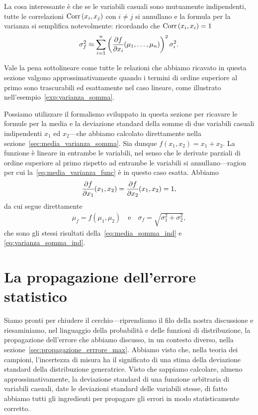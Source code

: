 La cosa interessante è che se le variabili casuali sono mutuamente
indipendenti, tutte le correlazioni $\text{Corr}\left(x_i, x_j\right)$ con $i \neq j$ si
annullano e la formula per la varianza si semplifica notevolmente: ricordando
che $\text{Corr}\left(x_i, x_i\right) = 1$
\begin{align}\label{eq:varianza_func_indipendente}
  \sigma^2_f \approx
  \sum_{i = 1}^{n} \left(\pd{f}{x_i}{\mu_1,\ldots,\mu_n}\right)^2 \sigma^2_i.
\end{align}

Vale la pena sottolineare come tutte le relazioni che abbiamo ricavato in
questa sezione valgono approssimativamente quando i termini di ordine
superiore al primo sono trascurabili ed esattamente nel caso lineare, come
illustrato nell'esempio~\ref{exp:varianza_somma}.

\begin{examplebox}
  \begin{example}\label{exp:varianza_somma}
    Possiamo utilizzare il formalismo sviluppato in questa sezione per ricavare
    le formule per la media e la deviazione standard della somme di due
    variabili casuali indipendenti $x_1$ ed $x_2$---che abbiamo calcolato
    direttamente nella sezione~\ref{sec:media_varianza_somma}.
    Sia dunque $f(x_1, x_2) = x_1 + x_2$. La funzione è lineare in entrambe
    le variabili, nel senso che le derivate parziali di ordine superiore al
    primo rispetto ad entrambe le variabili si annullano---ragion per cui
    la~\eqref{eq:media_varianza_func} è in questo caso esatta. Abbiamo
    \begin{align*}
      \pd{f}{x_1}{x_1, x_2} = \pd{f}{x_2}{x_1, x_2} = 1,
    \end{align*}
    da cui segue direttamente
    \begin{align*}
      \mu_f = f(\mu_1, \mu_2)
      \quad \text{e} \quad
      \sigma_f = \sqrt{\sigma_1^2 + \sigma_2^2},
    \end{align*}
    che sono gli stessi risultati della~\eqref{eq:media_somma_ind} e
    \eqref{eq:varianza_somma_ind}.
  \end{example}
\end{examplebox}


\section{La propagazione dell'errore statistico}
\label{sec:prop_errore_stat}

Siamo pronti per chiudere il cerchio---riprendiamo il filo della nostra
discussione e riesaminiamo, nel linguaggio della probabilità e delle funzioni
di distribuzione, la propagazione dell'errore che abbiamo discusso, in un
contesto diverso, nella sezione~\ref{sec:propagazione_errrore_max}.
Abbiamo visto che, nella teoria dei campioni, l'incertezza di misura ha il
significato di una stima della deviazione standard della distribuzione
generatrice. Visto che sappiamo calcolare, almeno approssimativamente, la
deviazione standard di una funzione arbitraria di variabili casuali, date le
deviazioni standard delle variabili stesse, di fatto abbiamo tutti gli
ingredienti per propagare gli errori in modo statisticamente corretto.

